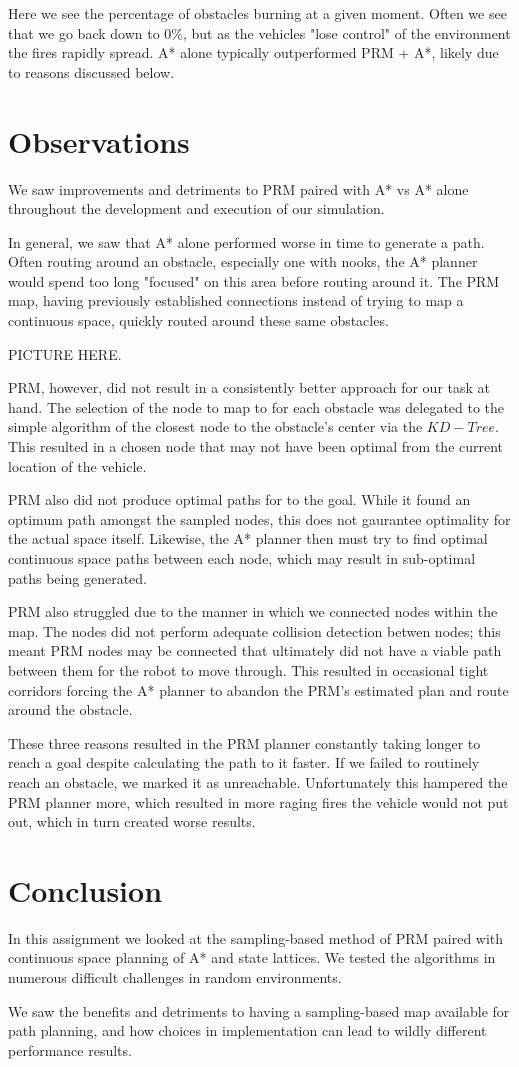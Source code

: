 \documentclass{article}
\begin{document}
Here we see the percentage of obstacles burning at a given moment. Often we see that we go back down to $0\%$, but as the vehicles "lose control" of the environment the fires rapidly spread. A* alone typically outperformed PRM + A*, likely due to reasons discussed below.


\section*{Observations}
We saw improvements and detriments to PRM paired with A* vs A* alone throughout the development and execution of our simulation.

In general, we saw that A* alone performed worse in time to generate a path. Often routing around an obstacle, especially one with nooks, the A* planner would spend too long "focused" on this area before routing around it. The PRM map, having previously established connections instead of trying to map a continuous space, quickly routed around these same obstacles.

PICTURE HERE.

PRM, however, did not result in a consistently better approach for our task at hand. The selection of the node to map to for each obstacle was delegated to the simple algorithm of the closest node to the obstacle's center via the $KD-Tree$. This resulted in a chosen node that may not have been optimal from the current location of the vehicle.

PRM also did not produce optimal paths for to the goal. While it found an optimum path amongst the sampled nodes, this does not gaurantee optimality for the actual space itself. Likewise, the A* planner then must try to find optimal continuous space paths between each node, which may result in sub-optimal paths being generated.

PRM also struggled due to the manner in which we connected nodes within the map. The nodes did not perform adequate collision detection betwen nodes; this meant PRM nodes may be connected that ultimately did not have a viable path between them for the robot to move through. This resulted in occasional tight corridors forcing the A* planner to abandon the PRM's estimated plan and route around the obstacle.

These three reasons resulted in the PRM planner constantly taking longer to reach a goal despite calculating the path to it faster. If we failed to routinely reach an obstacle, we marked it as unreachable. Unfortunately this hampered the PRM planner more, which resulted in more raging fires the vehicle would not put out, which in turn created worse results.

\section*{Conclusion}

In this assignment we looked at the sampling-based method of PRM paired with continuous space planning of A* and state lattices. We tested the algorithms in numerous difficult challenges in random environments.

We saw the benefits and detriments to having a sampling-based map available for path planning, and how choices in implementation can lead to wildly different performance results.
\end{document}
